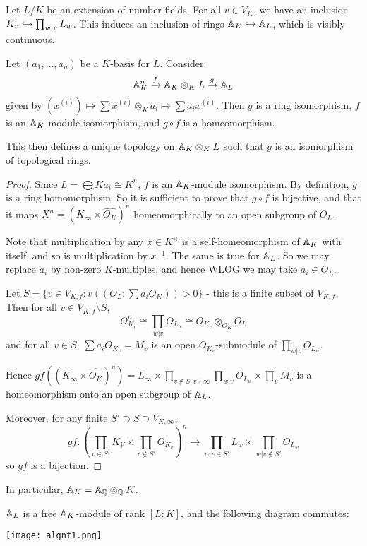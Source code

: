 \documentclass[10pt,a4paper]{article}
\begin{document}
Let $L/K$ be an extension of number fields. For all $v \in V_K$, we have an inclusion $K_v \hookrightarrow \prod_{w|v} L_w$. This induces an inclusion of rings $\mathbb{A}_K \hookrightarrow \mathbb{A}_L$, which is visibly continuous.
\begin{proposition}
  Let $(a_1, \ldots, a_n)$ be a $K$-basis for $L$. Consider:
  \[\mathbb{A}_K^n \xrightarrow{f} \mathbb{A}_K \otimes_K L \xrightarrow{g} \mathbb{A}_L\]
  given by $(x^{(i)})\mapsto \sum x^{(i)}\otimes_K a_i \mapsto \sum a_i x^{(i)}$. Then $g$ is a ring isomorphism, $f$ is an $\mathbb{A}_K$-module isomorphism, and $g \circ f$ is a homeomorphism.

  This then defines a unique topology on $\mathbb{A}_K \otimes_K L$ such that $g$ is an isomorphism of topological rings.
\end{proposition}
\begin{proof}
  Since $L = \bigoplus Ka_i \cong K^n$, $f$ is an $\mathbb{A}_K$-module isomorphism. By definition, $g$ is a ring homomorphism. So it is sufficient to prove that $g \circ f$ is bijective, and that it maps $X^n = (K_\infty \times \hat{O_K})^n$ homeomorphically to an open subgroup of $O_L$.

  Note that multiplication by any $x \in K^\times$ is a self-homeomorphism of $\mathbb{A}_K$ with itself, and so is multiplication by $x^{-1}$. The same is true for $\mathbb{A}_L$. So we may replace $a_i$ by non-zero $K$-multiples, and hence WLOG we may take $a_i \in O_L$.

  Let $S = \{v \in V_{K,f} : v((O_L:\sum a_i O_K)) > 0\}$ - this is a finite subset of $V_{K,f}$. Then for all $v \in V_{K,f} \setminus S$,
  \[O_{K_v}^n \cong \prod_{w|v}O_{L_w} \cong O_{K_v}\otimes_{O_K}O_L\]
  and for all $v \in S$, $\sum a_i O_{K_v} = M_v$ is an open $O_{K_v}$-submodule of $\prod_{w|v}O_{L_w}$.

  Hence $gf((K_\infty \times \hat{O_K})^n)  = L_\infty \times \prod_{v\notin S, v\nmid \infty}\prod_{w|v}O_{L_w} \times \prod_v M_v$ is a homeomorphism onto an open subgroup of $\mathbb{A}_L$.

  Moreover, for any finite $S' \supset S \supset V_{K,\infty}$,
  \[gf:(\prod_{v \in S'} K_V \times \prod_{v\notin S'}O_{K_v})^n \to \prod_{w|v\in S'} L_w \times \prod_{w|v\notin S'} O_{L_w}\]
  so $gf$ is a bijection.
\end{proof}
In particular, $\mathbb{A}_K = \mathbb{A}_{\mathbb{Q}} \otimes_{\mathbb{Q}} K$.
\begin{corollary}
  $\mathbb{A}_L$ is a free $\mathbb{A}_K$-module of rank $[L:K]$, and the following diagram commutes:
  \begin{center}
    \texttt{[image: algnt1.png]}
  \end{center}
\end{corollary}
\end{document}
